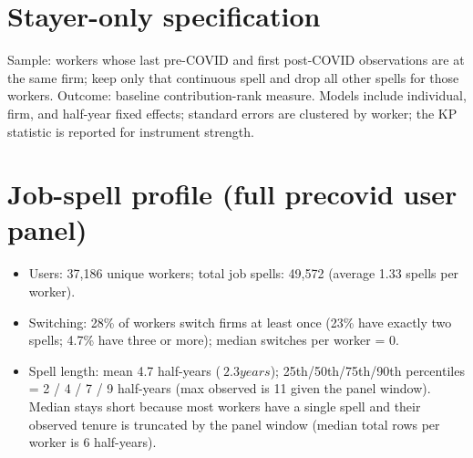 \documentclass[11pt]{article}
\begin{document}
\section*{Stayer-only specification}
Sample: workers whose last pre-COVID and first post-COVID observations are at the same firm; keep only that continuous spell and drop all other spells for those workers. Outcome: baseline contribution-rank measure. Models include individual, firm, and half-year fixed effects; standard errors are clustered by worker; the KP statistic is reported for instrument strength.

\section*{Job-spell profile (full precovid user panel)}
\begin{itemize}
  \item Users: 37{,}186 unique workers; total job spells: 49{,}572 (average 1.33 spells per worker).
  \item Switching: 28\% of workers switch firms at least once (23\% have exactly two spells; 4.7\% have three or more); median switches per worker = 0.
  \item Spell length: mean 4.7 half-years (\(~2.3 years\)); 25th/50th/75th/90th percentiles = 2 / 4 / 7 / 9 half-years (max observed is 11 given the panel window). Median stays short because most workers have a single spell and their observed tenure is truncated by the panel window (median total rows per worker is 6 half-years).
\end{itemize}


\end{document}
